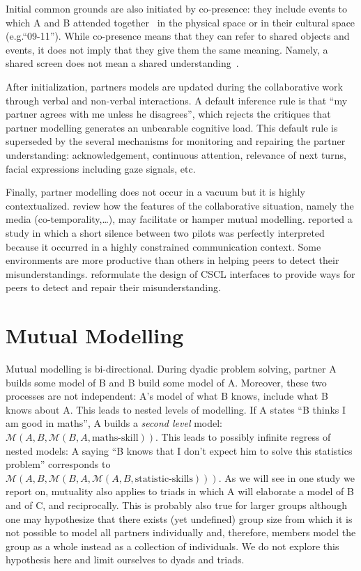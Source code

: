 \documentclass[natbib]{svjour3}
\newcommand{\eg}{e.g.\xspace}
\newcommand{\A}{A\xspace}
\newcommand{\B}{B\xspace}
\newcommand{\M}[3]{{\mathcal{M}(#1, #2, #3)}}
\newcommand{\model}[3]{{$\mathcal{M}(#1, #2, #3)$}}
\begin{document}
Initial common grounds are also initiated by co-presence: they include events to
which \A and \B attended together~\citep{clark2002definite} in the physical
space or in their cultural space (\eg ``09-11''). While co-presence means that
they can refer to shared objects and events, it does not imply that they give
them the same meaning. Namely, a shared screen does not mean a shared
understanding~\citep{dillenbourg2006sharing}.

After initialization, partners models are updated during the collaborative work
through verbal and non-verbal interactions. A default inference rule is that ``my
partner agrees with me unless he disagrees'', which rejects the critiques that
partner modelling generates an unbearable cognitive load. This default rule is
superseded by the several mechanisms for monitoring and repairing the partner
understanding: acknowledgement, continuous attention, relevance of next turns,
facial expressions including gaze signals, etc.

Finally, partner modelling does not occur in a vacuum but it is highly
contextualized.  \citet{clark1991grounding} review how the features of the
collaborative situation, namely the media (co-temporality,\ldots), may
facilitate or hamper mutual modelling.  \citet{hutchins1997constructing}
reported a study in which a short silence between two pilots was perfectly
interpreted because it occurred in a highly constrained communication context.
Some environments are more productive than others in helping peers to detect
their misunderstandings.  \citet{roschelle1995construction} reformulate the
design of CSCL interfaces to provide ways for peers to detect and repair their
misunderstanding.




\section{Mutual Modelling}

Mutual modelling is bi-directional. During dyadic problem solving,   partner A
builds some model of \B and \B build some model of \A.  Moreover, these two
processes are not independent: \A's model of what \B knows, include what \B knows
about \A.  This leads to nested levels of  modelling. If \A states ``\B thinks I
am good in maths'', \A builds a \emph{second level} model:
\model{A}{B}{\M{B}{A}{\text{maths-skill}}}. This leads to possibly infinite
regress of nested models: \A saying ``\B knows that I don't expect him to
solve this statistics problem'' corresponds to \\
\model{A}{B}{\M{B}{A}{\M{A}{B}{\text{statistic-skills}}}}.  As we will see in
one study we report on, mutuality also applies to triads in which \A will elaborate
a model of \B and of C, and reciprocally. This is probably also true for larger
groups although one may hypothesize that there exists (yet undefined) group size
from which it is not possible to model all partners individually and, therefore,
members  model  the group as a whole instead as a collection of individuals.  We
do not explore this hypothesis here and limit ourselves to dyads and triads.
\end{document}
